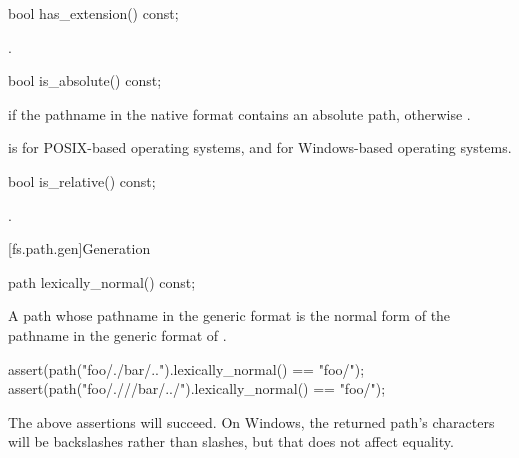 %
\begin{itemdecl}
bool has_extension() const;
\end{itemdecl}

\begin{itemdescr}
\pnum
\returns
{}.
\end{itemdescr}

%
\begin{itemdecl}
bool is_absolute() const;
\end{itemdecl}

\begin{itemdescr}
\pnum
\returns
{} if the pathname in the native format
  contains an absolute path, otherwise .

\pnum
\begin{example}
 is
       for  POSIX-based operating systems, and  for Windows-based
operating systems.
\end{example}
\end{itemdescr}

%
\begin{itemdecl}
bool is_relative() const;
\end{itemdecl}

\begin{itemdescr}
\pnum
\returns
{}.
\end{itemdescr}

[fs.path.gen]{Generation}

%
\begin{itemdecl}
path lexically_normal() const;
\end{itemdecl}

\begin{itemdescr}
\pnum
\returns
A path whose pathname in the generic format is
the normal form of the pathname
in the generic format of .

\pnum
\begin{example}
\begin{codeblock}
assert(path("foo/./bar/..").lexically_normal() == "foo/");
assert(path("foo/.///bar/../").lexically_normal() == "foo/");
\end{codeblock}
The above assertions will succeed.
On Windows, the returned path's  characters
will be backslashes rather than slashes,
but that does not affect  equality.
\end{example}
\end{itemdescr}

